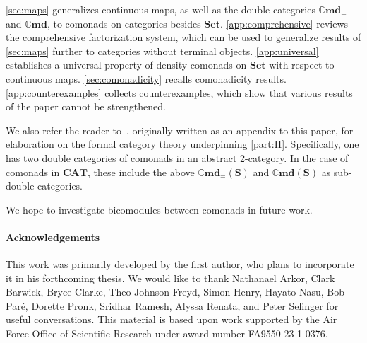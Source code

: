 \documentclass[11pt, oneside, article]{memoir}
\theoremstyle{plain}
\theoremstyle{definition}
\theoremstyle{remark}
\newcommand{\namedcat}[1]{\mathbf{#1}}
\newcommand{\cat}[1]{\mathbf{#1}}
\newcommand{\Set}{\namedcat{Set}}
\newcommand{\CAT}{\namedcat{CAT}}
\newcommand{\Cmd}{\mathbb{C}\namedcat{md}}
\newcommand{\CmdSet}{\Cmd}
\newcommand{\CmdId}{\Cmd_=}
\newcommand{\CmdIdSet}{\CmdId}
\newcommand{\bS}{\cat{S}}
\newcommand{\thanksAFOSR}[1]{This material is based upon work supported by the Air Force Office of Scientific Research under award number #1}
\begin{document}
\cref{sec:maps} generalizes continuous maps, as well as the double
categories $\CmdIdSet$ and $\CmdSet$, to comonads on categories
besides $\Set$.
\cref{app:comprehensive} reviews the comprehensive factorization
system, which can be used to generalize results of \cref{sec:maps}
further to categories without terminal objects. \cref{app:universal}
establishes a universal property of density comonads on $\Set$ with
respect to continuous maps. \cref{sec:comonadicity} recalls
comonadicity results.  \cref{app:counterexamples} collects
counterexamples, which show that various results of the paper cannot
be strengthened.

We also refer the reader to~\cite{fairbanks:monads}, originally
written as an appendix to this paper, for elaboration on the formal
category theory underpinning \cref{part:II}. Specifically, one has two
double categories of comonads in an abstract 2-category. In the case
of comonads in $\CAT$, these include the above $\CmdId(\bS)$ and
$\Cmd(\bS)$ as sub-double-categories.

We hope to investigate bicomodules between comonads in future work.

\paragraph{Acknowledgements}
This work was primarily developed by the first author, who plans to
incorporate it in his forthcoming thesis. We would like to thank
Nathanael Arkor, Clark Barwick, Bryce Clarke, Theo Johnson-Freyd,
Simon Henry, Hayato Nasu, Bob Par\'e, Dorette Pronk, Sridhar Ramesh,
Alyssa Renata, and Peter Selinger for useful conversations.
\thanksAFOSR{FA9550-23-1-0376}.

\vspace{35pt}
\end{document}
